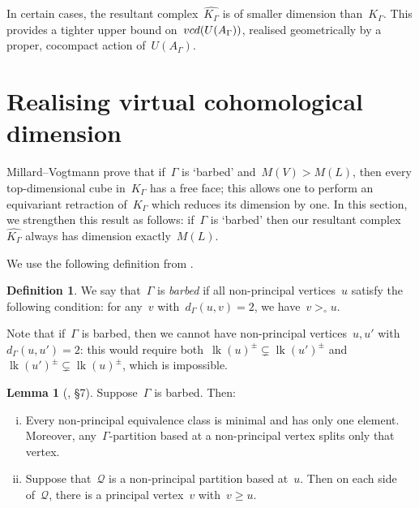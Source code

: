 \documentclass[11pt]{amsart}
\theoremstyle{definition}
\theoremstyle{definition}
\theoremstyle{definition}
\theoremstyle{definition}
\newtheorem{lemma}[theorem]{Lemma}
\newtheorem{definition}[theorem]{Definition}
\newcommand{\calQ}{\mathcal{Q}}
\newcommand{\uag}{U(A_{\Gamma})} %
\newcommand{\vcduag}{\textsc{vcd}(U(A_{\Gamma}))} %
\newcommand{\link}[1]{\operatorname{lk}({#1})} %
\newcommand{\spine}{K_{\Gamma}} %
\newcommand{\res}{\widehat{K_\Gamma}} %
\begin{document}
In certain cases, the resultant complex~$\res$ is of smaller dimension than~$\spine$. This provides a tighter upper bound on~$\vcduag$, realised geometrically by a proper, cocompact action of~$\uag$.

\section{Realising virtual cohomological dimension}\label{sec:realising vcd}

Millard--Vogtmann \cite{MillardVogtmannCubeComplexes21} prove that if~$\Gamma$ is `barbed' and~$M(V) > M(L)$, then every top-dimensional cube in~$\spine$ has a free face; this allows one to perform an equivariant retraction of~$\spine$ which reduces its dimension by one. In this section, we strengthen this result as follows: if~$\Gamma$ is `barbed' then our resultant complex~$\res$ always has dimension exactly~$M(L)$.


We use the following definition from \cite{MillardVogtmannCubeComplexes21}.

\begin{definition}\label{def:barbed}
    We say that~$\Gamma$ is \emph{barbed} if all non-principal vertices~$u$ satisfy the following condition: for any~$v$ with~$d_\Gamma(u, v) = 2$, we have~$v >_\circ u$.
\end{definition}

Note that if~$\Gamma$ is barbed, then we cannot have non-principal vertices~$u, u'$ with~$d_\Gamma(u, u') = 2$: this would require both~$\link{u}^\pm \subsetneq \link{u'}^\pm$ and~$\link{u'}^\pm \subsetneq \link{u}^\pm$, which is impossible.

\begin{lemma}[\cite{MillardVogtmannCubeComplexes21}, \S7]\label{lem:consequences of barbed}
    Suppose~$\Gamma$ is barbed. Then:
    \begin{enumerate}[(i)]
        \item Every non-principal equivalence class is minimal and has only one element. Moreover, any~$\Gamma$-partition based at a non-principal vertex splits only that vertex.
        \item Suppose that~$\calQ$ is a non-principal partition based at~$u$. Then on each side of~$\calQ$, there is a principal vertex~$v$ with~$v \geq u$.
    \end{enumerate}
\end{lemma}
\end{document}
